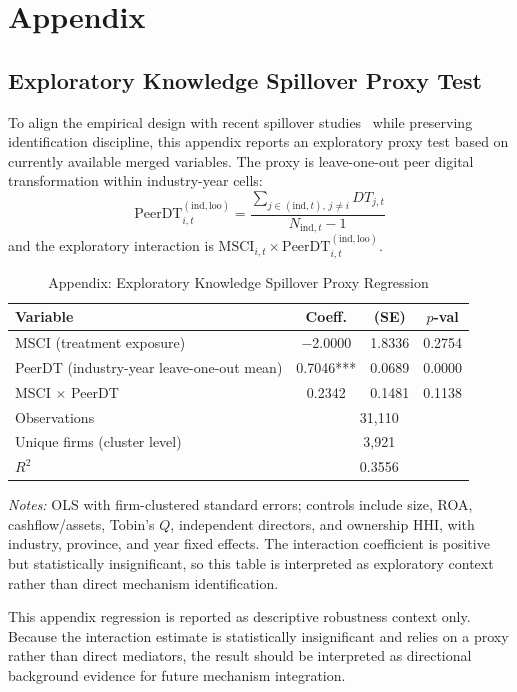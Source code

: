 \appendix

\chapter*{Appendix}
\label{chap:appendix}
{}
\renewcommand{\thesection}{\arabic{section}}
\renewcommand{\thesubsection}{\arabic{section}.\arabic{subsection}}
\renewcommand{\thesubsubsection}{\arabic{section}.\arabic{subsection}.\arabic{subsubsection}}

\section{Exploratory Knowledge Spillover Proxy Test}

To align the empirical design with recent spillover studies~\cite{WangWang2026,LiuGu2026} while preserving identification discipline, this appendix reports an exploratory proxy test based on currently available merged variables. The proxy is leave-one-out peer digital transformation within industry-year cells:
\begin{equation}
\label{eq:peer_dt_appendix}
\mathrm{PeerDT}_{i,t}^{\mathrm{(ind,loo)}} = \frac{\sum_{j \in (\mathrm{ind},t),\, j \neq i} DT_{j,t}}{N_{\mathrm{ind},t} - 1}
\end{equation}
and the exploratory interaction is $\mathrm{MSCI}_{i,t} \times \mathrm{PeerDT}_{i,t}^{\mathrm{(ind,loo)}}$.

\begin{table}[!htbp]
\centering
\caption{Appendix: Exploratory Knowledge Spillover Proxy Regression}
\label{tab:appendix_spillover_proxy}
\small
\begin{tabular}{lccc}
\toprule
\textbf{Variable} & \textbf{Coeff.} & \textbf{(SE)} & \textbf{$p$-val} \\
\midrule
MSCI (treatment exposure) & $-$2.0000 & 1.8336 & 0.2754 \\
PeerDT (industry-year leave-one-out mean) & 0.7046*** & 0.0689 & 0.0000 \\
MSCI $\times$ PeerDT & 0.2342 & 0.1481 & 0.1138 \\
\midrule
Observations & \multicolumn{3}{c}{31,110} \\
Unique firms (cluster level) & \multicolumn{3}{c}{3,921} \\
$R^2$ & \multicolumn{3}{c}{0.3556} \\
\bottomrule
\end{tabular}
\begin{tablenotes}
\small
\item \textit{Notes:} OLS with firm-clustered standard errors; controls include size, ROA, cashflow/assets, Tobin's $Q$, independent directors, and ownership HHI, with industry, province, and year fixed effects. The interaction coefficient is positive but statistically insignificant, so this table is interpreted as exploratory context rather than direct mechanism identification.
\end{tablenotes}
\end{table}

This appendix regression is reported as descriptive robustness context only. Because the interaction estimate is statistically insignificant and relies on a proxy rather than direct mediators, the result should be interpreted as directional background evidence for future mechanism integration.
